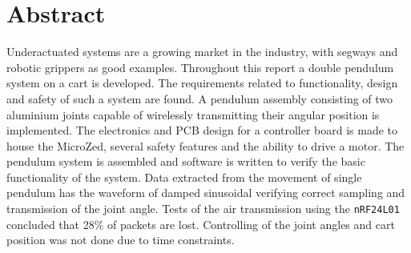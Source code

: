 \section*{Abstract}

Underactuated systems are a growing market in the industry, with segways and robotic grippers as good examples.
Throughout this report a double pendulum system on a cart is developed.
The requirements related to functionality, design and safety of such a system are found.
A pendulum assembly consisting of two aluminium joints capable of wirelessly transmitting their angular position is implemented.
The electronics and PCB design for a controller board is made to house the MicroZed, several safety features and the ability to drive a motor.
The pendulum system is assembled and software is written to verify the basic functionality of the system.
Data extracted from the movement of single pendulum has the waveform of damped sinusoidal verifying correct sampling and transmission of the joint angle.
Tests of the air transmission using the \texttt{nRF24L01} concluded that 28\% of packets are lost.
Controlling of the joint angles and cart position was not done due to time constraints.